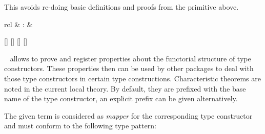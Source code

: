 \begin{isabellebody}
\begin{isamarkuptext}
This avoids re-doing basic definitions and proofs from the
  primitive \hyperlink{command.typedef}{\mbox{}} above.%
\end{isamarkuptext}%
\isamarkuptrue%
%
\isamarkuptrue%
%
\begin{isamarkuptext}%
\begin{matharray}{rcl}
    \hypertarget{command.HOL.enriched-type}{\hyperlink{command.HOL.enriched-type}{\mbox{}}} & : & 
  \end{matharray}

  \begin{railoutput}
[]
\rail@bar
{}
[]
[]
\rail@endbar
{}[]
\rail@end
\end{railoutput}


  \begin{description}

  \item \hyperlink{command.HOL.enriched-type}{\mbox{}}~ allows to
  prove and register properties about the functorial structure of type
  constructors.  These properties then can be used by other packages
  to deal with those type constructors in certain type constructions.
  Characteristic theorems are noted in the current local theory.  By
  default, they are prefixed with the base name of the type
  constructor, an explicit prefix can be given alternatively.

  The given term  is considered as \emph{mapper} for the
  corresponding type constructor and must conform to the following
  type pattern:


\end{description}
\end{isamarkuptext}
\end{isabellebody}
